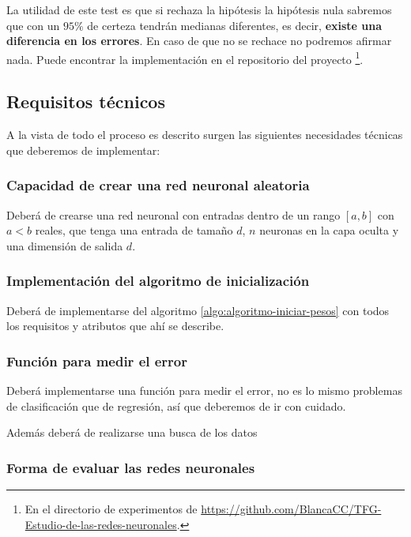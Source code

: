 La utilidad de este test es que si rechaza la hipótesis la hipótesis nula sabremos que con un $95 \%$ de certeza tendrán medianas diferentes, es decir, \textbf{existe una 
diferencia en los errores}. En caso de que no se rechace no podremos afirmar nada.
Puede encontrar la implementación en el repositorio del
 proyecto \footnote{En el directorio de experimentos 
 de \url{https://github.com/BlancaCC/TFG-Estudio-de-las-redes-neuronales}.}.

\subsection{Requisitos técnicos}  

A la vista de todo el proceso es descrito surgen las siguientes necesidades técnicas que deberemos de implementar:  

\subsubsection{Capacidad de crear una red neuronal aleatoria}  

Deberá de crearse una red neuronal con entradas dentro de un rango $[a,b]$ con $a < b$ reales,
que tenga una entrada de tamaño $d$,
$n$ neuronas en la capa oculta y
una dimensión de salida $d$.

\subsubsection{Implementación del algoritmo de inicialización}

Deberá de implementarse del algoritmo  \ref{algo:algoritmo-iniciar-pesos} con todos los requisitos y atributos que ahí se describe.  

\subsubsection{Función para medir el error}

Deberá implementarse una función para medir el
 error, no es lo mismo problemas de clasificación 
que de regresión, así que deberemos de ir con 
cuidado. 

Además deberá de realizarse una busca de los datos 

\subsubsection{ Forma de evaluar las redes neuronales}  

